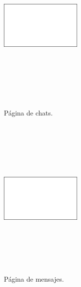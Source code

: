 \documentclass[a4paper, 12pt]{article}
\begin{document}
\begin{figure}[H]
   	\begin{minipage}{0.48\textwidth}
		\begin{center}
			{\includegraphics[height=8cm, width=4cm]{White.png}\par}
			\caption{Página de chats.}
			\medskip
		\end{center}  
	\end{minipage}\hfill
   	\begin{minipage}{0.48\textwidth}
		\begin{center}
			{\includegraphics[height=8cm, width=4cm]{White.png}\par}
			\caption{Página de mensajes.}
			\medskip
		\end{center}  
	\end{minipage}\hfill
\end{figure}
\end{document}
